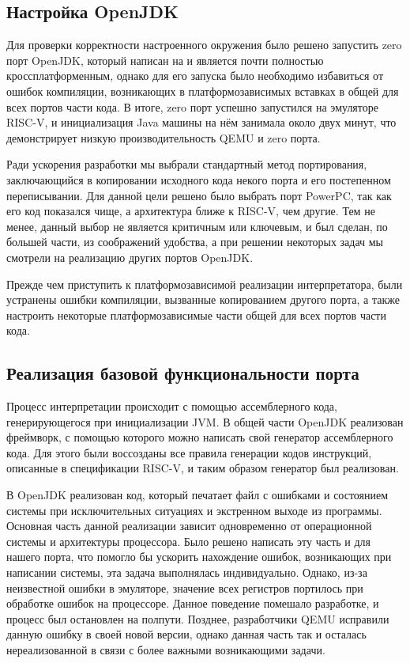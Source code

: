     
\subsection{Настройка OpenJDK}

Для проверки корректности настроенного окружения было решено запустить zero порт OpenJDK, который написан на \cpp и является почти полностью кроссплатформенным, однако для его запуска было необходимо избавиться от ошибок компиляции, возникающих в платформозависимых вставках в общей для всех портов части кода. В итоге, zero порт успешно запустился на эмуляторе RISC-V, и инициализация Java машины на нём занимала около двух минут, что демонстрирует низкую производительность QEMU и zero порта.


Ради ускорения разработки мы выбрали стандартный метод портирования, заключающийся в копировании исходного кода некого порта и его постепенном переписывании. Для данной цели решено было выбрать порт PowerPC, так как его код показался чище, а архитектура ближе к RISC-V, чем другие. Тем не менее, данный выбор не является критичным или ключевым, и был сделан, по большей части, из соображений удобства, а при решении некоторых задач мы смотрели на реализацию других портов OpenJDK.

Прежде чем приступить к платформозависимой реализации интерпретатора, были устранены ошибки компиляции, вызванные копированием другого порта, а также настроить некоторые платформозависимые части общей для всех портов части кода.


\subsection{Реализация базовой функциональности порта}

Процесс интерпретации происходит с помощью ассемблерного кода, генерирующегося при инициализации JVM. В общей части OpenJDK реализован фреймворк, с помощью которого можно написать свой генератор ассемблерного кода. Для этого были воссозданы все правила генерации кодов инструкций, описанные в спецификации RISC-V, и таким образом генератор был реализован. 

В OpenJDK реализован код, который печатает файл с ошибками и состоянием системы при исключительных ситуациях и экстренном выходе из программы. Основная часть данной реализации зависит одновременно от операционной системы и архитектуры процессора. Было решено написать эту часть и для нашего порта, что помогло бы ускорить нахождение ошибок, возникающих при написании системы, эта задача выполнялась индивидуально. Однако, из-за неизвестной ошибки в эмуляторе, значение всех регистров портилось при обработке ошибок на процессоре. Данное поведение помешало разработке, и процесс был остановлен на полпути. Позднее, разработчики QEMU исправили данную ошибку в своей новой версии, однако данная часть так и осталась нереализованной в связи с более важными возникающими задачи.


